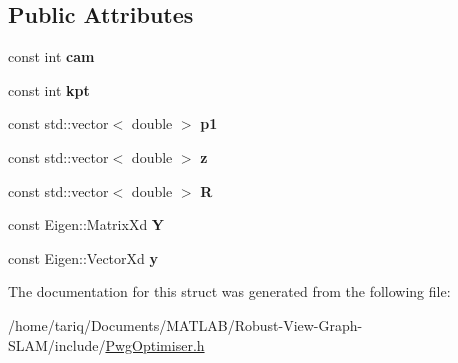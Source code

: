 \subsection*{Public Attributes}
\begin{DoxyCompactItemize}
\item 
const int {\bfseries cam}\hypertarget{structPwgOptimiser_1_1pulled__constraint_a6baab11c5c10c4411ba07d4d5397f973}{}\label{structPwgOptimiser_1_1pulled__constraint_a6baab11c5c10c4411ba07d4d5397f973}

\item 
const int {\bfseries kpt}\hypertarget{structPwgOptimiser_1_1pulled__constraint_a0caa4348b0544a74d0231c2be83a9324}{}\label{structPwgOptimiser_1_1pulled__constraint_a0caa4348b0544a74d0231c2be83a9324}

\item 
const std\+::vector$<$ double $>$ {\bfseries p1}\hypertarget{structPwgOptimiser_1_1pulled__constraint_ad755df2c3eea4f84987883f41b62eede}{}\label{structPwgOptimiser_1_1pulled__constraint_ad755df2c3eea4f84987883f41b62eede}

\item 
const std\+::vector$<$ double $>$ {\bfseries z}\hypertarget{structPwgOptimiser_1_1pulled__constraint_ab64d97f866b4771b20c2e57ebfe644e2}{}\label{structPwgOptimiser_1_1pulled__constraint_ab64d97f866b4771b20c2e57ebfe644e2}

\item 
const std\+::vector$<$ double $>$ {\bfseries R}\hypertarget{structPwgOptimiser_1_1pulled__constraint_a25ea6d42c540cb5667e5691082c0a1ae}{}\label{structPwgOptimiser_1_1pulled__constraint_a25ea6d42c540cb5667e5691082c0a1ae}

\item 
const Eigen\+::\+Matrix\+Xd {\bfseries Y}\hypertarget{structPwgOptimiser_1_1pulled__constraint_a9a2792b99e9f01d3aa88d0244fa17243}{}\label{structPwgOptimiser_1_1pulled__constraint_a9a2792b99e9f01d3aa88d0244fa17243}

\item 
const Eigen\+::\+Vector\+Xd {\bfseries y}\hypertarget{structPwgOptimiser_1_1pulled__constraint_ab5c4120cd329a9a63c86020a24f736bd}{}\label{structPwgOptimiser_1_1pulled__constraint_ab5c4120cd329a9a63c86020a24f736bd}

\end{DoxyCompactItemize}


The documentation for this struct was generated from the following file\+:\begin{DoxyCompactItemize}
\item 
/home/tariq/\+Documents/\+M\+A\+T\+L\+A\+B/\+Robust-\/\+View-\/\+Graph-\/\+S\+L\+A\+M/include/\hyperlink{PwgOptimiser_8h}{Pwg\+Optimiser.\+h}\end{DoxyCompactItemize}
